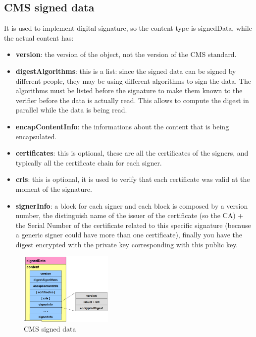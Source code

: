 \subsection{CMS signed data}
It is used to implement digital signature, so the content type is
signedData, while the actual content has:
\begin{itemize}
  \item \textbf{version}: the version of the object, not the version
    of the CMS standard.
  \item \textbf{digestAlgorithms}: this is a list: since the signed data
    can be signed by different people, they may be using different
    algorithms to sign the data. The algorithms must be listed before
    the signature to make them known to the verifier before the data is
    actually read. This allows to compute the digest in parallel while 
    the data is being read.
  \item \textbf{encapContentInfo}: the informations about the content
    that is being encapsulated.

  \item \textbf{certificates}: this is optional, these are all the certificates
    of the signers, and typically all the certificate chain for each
    signer.
  \item \textbf{crls}: this is optional, it is used to verify that
    each certificate was valid at the moment of the signature. 
  \item \textbf{signerInfo}: a block for each signer and each block is
    composed by a version number, the distinguish name of the issuer
    of the certificate (so the CA) + the Serial Number of the
    certificate related to this specific signature (because a generic
    signer could have more than one certificate), finally you have the
    digest encrypted with the private key corresponding with this
    public key.
\end{itemize}

\begin{figure}[H]
  \centering
  \includegraphics[width=0.4\textwidth]{img/cms signed data.png}
  \caption{CMS signed data}
\end{figure}

